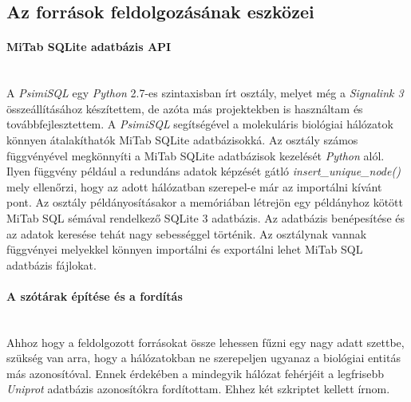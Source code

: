 \documentclass[a4paper,12pt]{article}
\begin{document}
		
		\subsection{Az források feldolgozásának eszközei}
		
			\paragraph{MiTab SQLite adatbázis API} \mbox{}\\
			A \textit{PsimiSQL} egy \textit{Python} 2.7-es szintaxisban írt osztály, melyet még a \textit{Signalink 3} összeállításához készítettem, de azóta más projektekben is használtam és továbbfejlesztettem. A \textit{PsimiSQL} segítségével a molekuláris biológiai hálózatok könnyen átalakíthatók MiTab SQLite adatbázisokká. Az osztály számos függvényével megkönnyíti a MiTab SQLite adatbázisok kezelését \textit{Python} alól. Ilyen függvény például a redundáns adatok képzését gátló \textit{insert\_unique\_node()} mely ellenőrzi, hogy az adott hálózatban szerepel-e már az importálni kívánt pont. Az osztály példányosításakor a memóriában létrejön egy példányhoz kötött MiTab SQL sémával rendelkező SQLite 3 adatbázis. Az adatbázis benépesítése és az adatok keresése tehát nagy sebességgel történik. Az osztálynak vannak függvényei melyekkel könnyen importálni és exportálni lehet MiTab SQL adatbázis fájlokat.
			
			\paragraph{A szótárak építése és a fordítás} \mbox{}\\
			Ahhoz hogy a feldolgozott forrásokat össze lehessen fűzni egy nagy adatt szettbe, szükség van arra, hogy a hálózatokban ne szerepeljen ugyanaz a biológiai entitás más azonosítóval. Ennek érdekében a mindegyik hálózat fehérjéit a legfrisebb \textit{Uniprot} adatbázis azonosítókra fordítottam. Ehhez két szkriptet kellett írnom. 
			
\end{document}
